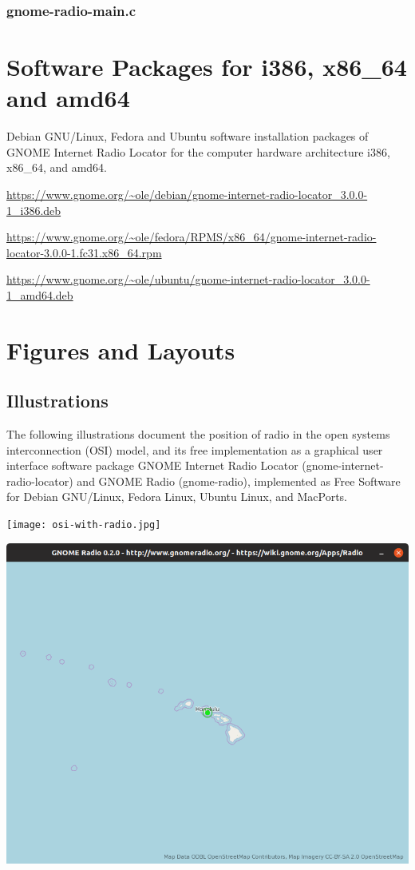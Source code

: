 \documentclass[a4paper,norsk,utf8]{report}
\begin{document}
\section{gnome-radio-main.c}





\part{Software Packages for i386, x86\_64 and amd64}

Debian GNU/Linux, Fedora and Ubuntu software installation packages of
GNOME Internet Radio Locator for the computer hardware architecture
i386, x86\_64, and amd64.

\url{https://www.gnome.org/~ole/debian/gnome-internet-radio-locator\_3.0.0-1\_i386.deb}

\url{https://www.gnome.org/~ole/fedora/RPMS/x86\_64/gnome-internet-radio-locator-3.0.0-1.fc31.x86\_64.rpm}

\url{https://www.gnome.org/~ole/ubuntu/gnome-internet-radio-locator\_3.0.0-1\_amd64.deb}

\part{Figures and Layouts}

\chapter{Illustrations}

The following illustrations document the position of radio in the open
systems interconnection (OSI) model, and its free implementation as a
graphical user interface software package GNOME Internet Radio Locator
(gnome-internet-radio-locator) and GNOME Radio (gnome-radio),
implemented as Free Software for Debian GNU/Linux, Fedora Linux,
Ubuntu Linux, and MacPorts.

\texttt{[image: osi-with-radio.jpg]}

\includegraphics[width=1.0\hsize]{gnome-radio-0.2.0.png}
\end{document}

